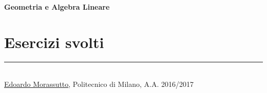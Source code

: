 




\raggedright
\footnotesize
\begin{multicols}{3}

\setlength{\premulticols}{1pt}
\setlength{\postmulticols}{1pt}
\setlength{\multicolsep}{1pt}
\setlength{\columnsep}{2pt}

{\Large{\textbf{Geometria e Algebra Lineare}}}

























\section{Esercizi svolti}














\rule{0.3\linewidth}{0.25pt}
\scriptsize\\
\href{mailto:edoardo.morassutto@mail.polimi.it}{Edoardo Morassutto}, Politecnico di Milano, A.A. 2016/2017
\end{multicols}

